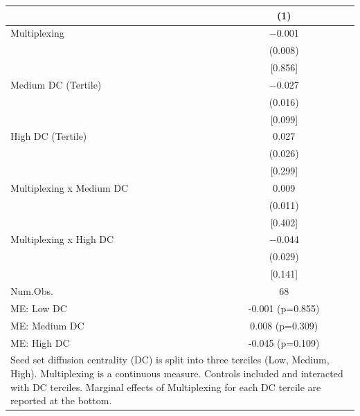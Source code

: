 \begin{table}
\centering
\begin{tabular}[t]{lc}
\toprule
  & (1)\\
\midrule
Multiplexing & \num{-0.001}\\
 & (\num{0.008})\\
 & {}[\num{0.856}]\\
Medium DC (Tertile) & \num{-0.027}\\
 & (\num{0.016})\\
 & {}[\num{0.099}]\\
High DC (Tertile) & \num{0.027}\\
 & (\num{0.026})\\
 & {}[\num{0.299}]\\
Multiplexing x Medium DC & \num{0.009}\\
 & (\num{0.011})\\
 & {}[\num{0.402}]\\
Multiplexing x High DC & \num{-0.044}\\
 & (\num{0.029})\\
 & {}[\num{0.141}]\\
\midrule
Num.Obs. & \num{68}\\
ME: Low DC & -0.001 (p=0.855)\\
ME: Medium DC & 0.008 (p=0.309)\\
ME: High DC & -0.045 (p=0.109)\\
\bottomrule
\multicolumn{2}{l}{\rule{0pt}{1em}Seed set diffusion centrality (DC) is split into three terciles (Low, Medium, High). Multiplexing is a continuous measure. Controls included and interacted with DC terciles. Marginal effects of Multiplexing for each DC tercile are reported at the bottom.}\\
\end{tabular}
\end{table}
